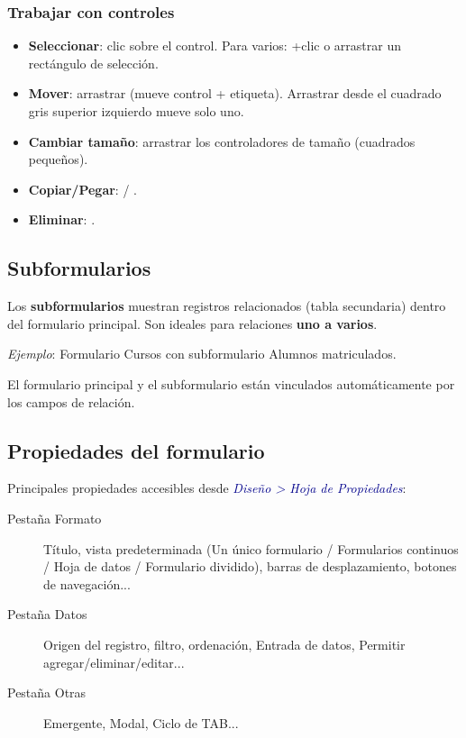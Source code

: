 \documentclass[12pt,a4paper]{article}
\newcommand{\tecla}[1]{\fbox{\small\texttt{#1}}}
\newcommand{\menu}[1]{\textit{\textcolor{darkblue}{#1}}}
\begin{document}
\subsubsection{Trabajar con controles}

\begin{itemize}
  \item \textbf{Seleccionar}: clic sobre el control. Para varios: \tecla{Ctrl}+clic o arrastrar un rectángulo de selección.
  \item \textbf{Mover}: arrastrar (mueve control + etiqueta). Arrastrar desde el cuadrado gris superior izquierdo mueve solo uno.
  \item \textbf{Cambiar tamaño}: arrastrar los controladores de tamaño (cuadrados pequeños).
  \item \textbf{Copiar/Pegar}: \tecla{Ctrl+C} / \tecla{Ctrl+V}.
  \item \textbf{Eliminar}: \tecla{Supr}.
\end{itemize}

\subsection{Subformularios}

Los \textbf{subformularios} muestran registros relacionados (tabla secundaria) dentro del formulario principal. Son ideales para relaciones \textbf{uno a varios}.

\textit{Ejemplo}: Formulario Cursos con subformulario Alumnos matriculados.

El formulario principal y el subformulario están vinculados automáticamente por los campos de relación.

\subsection{Propiedades del formulario}

Principales propiedades accesibles desde \menu{Diseño > Hoja de Propiedades}:

\begin{description}
  \item[Pestaña Formato] Título, vista predeterminada (Un único formulario / Formularios continuos / Hoja de datos / Formulario dividido), barras de desplazamiento, botones de navegación...
  \item[Pestaña Datos] Origen del registro, filtro, ordenación, Entrada de datos, Permitir agregar/eliminar/editar...
  \item[Pestaña Otras] Emergente, Modal, Ciclo de TAB...
\end{description}
\end{document}
